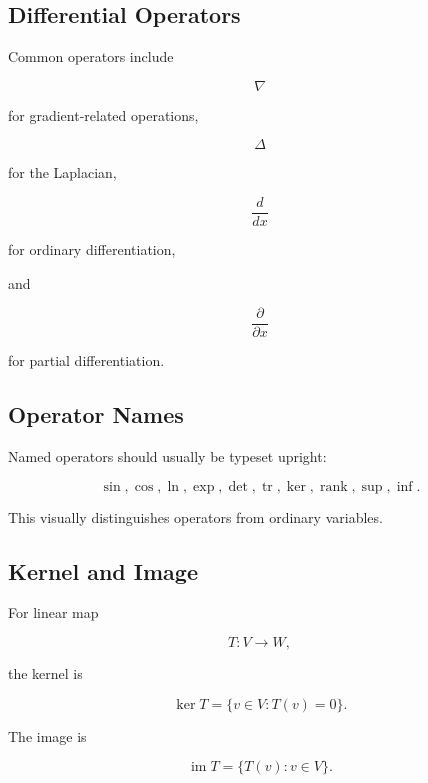 \subsection{Differential Operators}
\label{subsec:differential-operators-reference}

Common operators include

\[
\boxed{
\nabla
}
\]

for gradient-related operations,

\[
\boxed{
\Delta
}
\]

for the Laplacian,

\[
\boxed{
\frac{d}{dx}
}
\]

for ordinary differentiation,

and

\[
\boxed{
\frac{\partial}{\partial x}
}
\]

for partial differentiation.

\subsection{Operator Names}
\label{subsec:operator-names-reference}

Named operators should usually be typeset upright:

\[
\boxed{
\sin,
\cos,
\ln,
\exp,
\det,
\operatorname{tr},
\ker,
\operatorname{rank},
\sup,
\inf.
}
\]

This visually distinguishes operators from ordinary variables.

\subsection{Kernel and Image}
\label{subsec:kernel-image-reference}

For linear map

\[
T:V\to W,
\]

the kernel is

\[
\boxed{
\ker T
=
\{
v\in V:T(v)=0
\}.
}
\]

The image is

\[
\boxed{
\operatorname{im}T
=
\{
T(v):v\in V
\}.
}
\]


